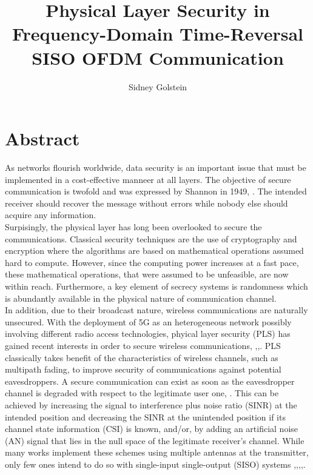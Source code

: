 \documentclass[]{article}
\title{Physical Layer Security in Frequency-Domain Time-Reversal SISO OFDM Communication}
\author{Sidney Golstein}
\begin{document}
\maketitle

\section*{Abstract}


As networks flourish worldwide, data security is an important issue that must be implemented in a cost-effective manneer 
at all layers. The objective of secure communication is twofold and was expressed  by Shannon in 1949,\cite{shannon1949communication} . The intended receiver should recover the message without errors while nobody else should acquire any information. \\

Surpisingly, the physical layer has long been overlooked to secure the communications. Classical security techniques are the use of cryptography and encryption where the algorithms are based on mathematical operations assumed hard to compute. However, since the computing power increases at a fast pace, these mathematical operations, that were assumed to be unfeasible, are now within reach.  Furthermore, a key element of secrecy systems is randomness which is abundantly available in the physical nature of communication channel. \\

 In addition, due to their broadcast nature, wireless communications are naturally unsecured. With the  deployment of 5G as an heterogeneous network possibly involving different radio access technologies, phyical layer security (PLS) has gained recent interests in order to secure wireless communications, \cite{alves2012performance},\cite{yang2012physical},\cite{tran2015secrecy}. PLS classically takes benefit of the characteristics of wireless channels, such as multipath fading, to improve security of communications against potential eavesdroppers. A secure communication can exist as soon as the eavesdropper channel is degraded with respect to the legitimate user one, \cite{wyner1975wire}. This can be achieved by increasing the signal to interference plus noise ratio (SINR) at the intended position and decreasing the SINR at the unintended position if its channel state information (CSI) is known, and/or, by adding an artificial noise (AN) signal that lies in the null space of the legitimate receiver's channel. While many works implement these schemes using multiple antennas at the transmitter, only few ones intend to do so with single-input single-output  (SISO) systems \cite{li2013waveform},\cite{nguyen2019frequency},\cite{xu2018security},\cite{li2017artificial},\cite{li2018artificial}.\\
\end{document}
